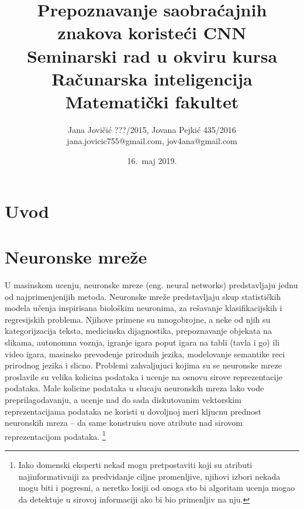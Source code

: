 \documentclass[a4paper]{article}
\begin{document}
\title{Prepoznavanje saobraćajnih znakova koristeći CNN\\ \small{Seminarski rad u okviru kursa\\Računarska inteligencija\\ Matematički fakultet}}

\author{Jana Jovičić ???/2015, Jovana Pejkić 435/2016 \\ jana.jovicic755@gmail.com, jov4ana@gmail.com}

\date{16.~maj 2019.}

\maketitle

\abstract{

}

\newpage

\tableofcontents

\newpage

\section{Uvod}
\label{sec:uvod}



\section{Neuronske mreže}
\label{sec:cnn}

U masinskom ucenju, neuronske mreze (eng. neural networks) predstavljaju jednu od najprimenjenijih metoda. Neuronske mreže predstavljaju skup statističkih modela učenja inspirisana biološkim neuronima, za rešavanje klasifikacijskih i regresijskih problema. Njihove primene su mnogobrojne, a neke od njih su kategorijzacija teksta, medicinska dijagnostika, prepoznavanje objekata na slikama, autonomna voznja, igranje igara poput igara na tabli (tavla i go) ili video igara, masinsko prevodenje prirodnih jezika, modelovanje semantike reci prirodnog jezika i slicno. Problemi zahvaljujuci kojima su se neuronske mreze proslavile su velika kolicina podataka i ucenje na osnovu sirove reprezentacije podataka. Male kolicine podataka u slucaju neuronskih mreza lako vode preprilagodavanju, a ucenje nad do sada diskutovanim vektorskim reprezentacijama podataka ne koristi u dovoljnoj meri kljucnu prednost neuronskih mreza – da same konstruisu nove atribute nad sirovom reprezentacijom podataka. \footnote{Iako domenski eksperti nekad mogu pretpostaviti koji su atributi najinformativniji za predvidanje ciljne promenljive, njihovi izbori nekada mogu biti i pogresni, a neretko losiji od onoga sto bi algoritam ucenja mogao da detektuje u sirovoj informaciji ako bi bio primenljiv na nju.}
\end{document}
